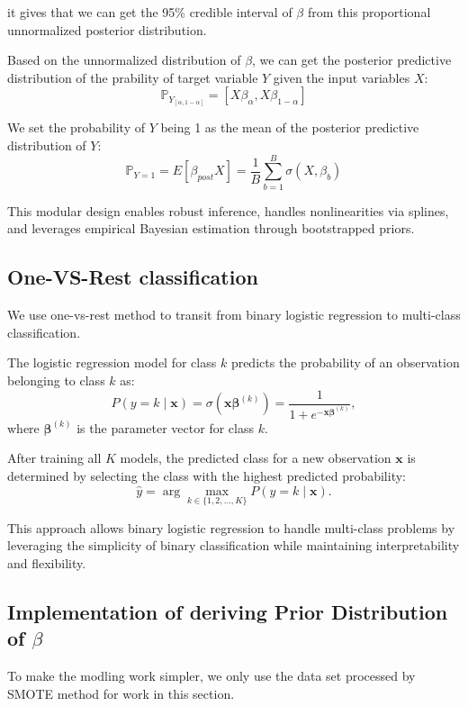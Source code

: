 it gives that we can get the 95\% credible interval of \(\beta\) from this 
proportional unnormalized posterior distribution.

Based on the unnormalized distribution of \(\beta\), 
we can get the posterior predictive distribution of the prability of 
target variable \(Y\) given the input variables \(X\):
\[
\mathbb P_{Y_{[\alpha, 1- \alpha]}} = [X \beta_{\alpha}, X \beta_{1 - \alpha}]
\]

We set the probability of \(Y\) being 1 as the mean of the posterior predictive distribution of \(Y\):
\[
\mathbb P_{Y=1} = E[\beta_{post} X] = \frac{1}{B} \sum_{b=1}^B \sigma(X, \beta_b)
\]

This modular design enables robust inference, handles nonlinearities via splines, and leverages empirical Bayesian estimation through bootstrapped priors.

\subsection{One-VS-Rest classification}

We use one-vs-rest method to transit from binary logistic regression to multi-class classification.

The logistic regression model for class \(k\) predicts the probability of an observation belonging to class \(k\) as:
\[
P(y = k \mid \mathbf{x}) = \sigma(\mathbf{x} \boldsymbol{\beta}^{(k)}) = \frac{1}{1 + e^{-\mathbf{x} \boldsymbol{\beta}^{(k)}}},
\]
where \(\boldsymbol{\beta}^{(k)}\) is the parameter vector for class \(k\).

After training all \(K\) models, the predicted class for a new observation \(\mathbf{x}\) is determined by selecting the class with the highest predicted probability:
\[
\hat{y} = \arg\max_{k \in \{1, 2, \dots, K\}} P(y = k \mid \mathbf{x}).
\]

This approach allows binary logistic regression to handle multi-class problems by leveraging the simplicity of binary classification while maintaining interpretability and flexibility.


\subsection{Implementation of deriving Prior Distribution of $\beta$}

To make the modling work simpler, we only use the data set processed by SMOTE method for work in this 
section.






